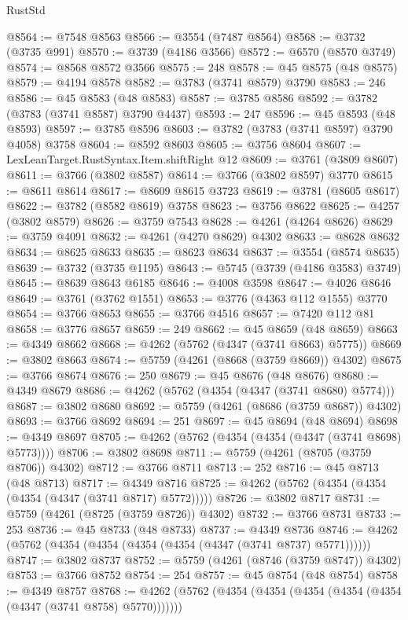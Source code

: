 \begin{lexlean}{RustStd}
\begin{coremodule}
@8564 := @7548 @8563
@8566 := @3554 (@7487 @8564)
@8568 := @3732 (@3735 @991)
@8570 := @3739 (@4186 @3566)
@8572 := @6570 (@8570 @3749)
@8574 := @8568 @8572 @3566
@8575 := 248
@8578 := @45 @8575 (@48 @8575)
@8579 := @4194 @8578
@8582 := @3783 (@3741 @8579) @3790
@8583 := 246
@8586 := @45 @8583 (@48 @8583)
@8587 := @3785 @8586
@8592 := @3782 (@3783 (@3741 @8587) @3790 @4437)
@8593 := 247
@8596 := @45 @8593 (@48 @8593)
@8597 := @3785 @8596
@8603 := @3782 (@3783 (@3741 @8597) @3790 @4058) @3758
@8604 := @8592 @8603
@8605 := @3756 @8604
@8607 := LexLeanTarget.RustSyntax.Item.shiftRight @12
@8609 := @3761 (@3809 @8607)
@8611 := @3766 (@3802 @8587)
@8614 := @3766 (@3802 @8597) @3770
@8615 := @8611 @8614
@8617 := @8609 @8615 @3723
@8619 := @3781 (@8605 @8617)
@8622 := @3782 (@8582 @8619) @3758
@8623 := @3756 @8622
@8625 := @4257 (@3802 @8579)
@8626 := @3759 @7543
@8628 := @4261 (@4264 @8626)
@8629 := @3759 @4091
@8632 := @4261 (@4270 @8629) @4302
@8633 := @8628 @8632
@8634 := @8625 @8633
@8635 := @8623 @8634
@8637 := @3554 (@8574 @8635)
@8639 := @3732 (@3735 @1195)
@8643 := @5745 (@3739 (@4186 @3583) @3749)
@8645 := @8639 @8643 @6185
@8646 := @4008 @3598
@8647 := @4026 @8646
@8649 := @3761 (@3762 @1551)
@8653 := @3776 (@4363 @112 @1555) @3770
@8654 := @3766 @8653
@8655 := @3766 @4516
@8657 := @7420 @112 @81
@8658 := @3776 @8657
@8659 := 249
@8662 := @45 @8659 (@48 @8659)
@8663 := @4349 @8662
@8668 := @4262 (@5762 (@4347 (@3741 @8663) @5775))
@8669 := @3802 @8663
@8674 := @5759 (@4261 (@8668 (@3759 @8669)) @4302)
@8675 := @3766 @8674
@8676 := 250
@8679 := @45 @8676 (@48 @8676)
@8680 := @4349 @8679
@8686 := @4262 (@5762 (@4354 (@4347 (@3741 @8680) @5774)))
@8687 := @3802 @8680
@8692 := @5759 (@4261 (@8686 (@3759 @8687)) @4302)
@8693 := @3766 @8692
@8694 := 251
@8697 := @45 @8694 (@48 @8694)
@8698 := @4349 @8697
@8705 := @4262 (@5762 (@4354 (@4354 (@4347 (@3741 @8698) @5773))))
@8706 := @3802 @8698
@8711 := @5759 (@4261 (@8705 (@3759 @8706)) @4302)
@8712 := @3766 @8711
@8713 := 252
@8716 := @45 @8713 (@48 @8713)
@8717 := @4349 @8716
@8725 := @4262 (@5762 (@4354 (@4354 (@4354 (@4347 (@3741 @8717) @5772)))))
@8726 := @3802 @8717
@8731 := @5759 (@4261 (@8725 (@3759 @8726)) @4302)
@8732 := @3766 @8731
@8733 := 253
@8736 := @45 @8733 (@48 @8733)
@8737 := @4349 @8736
@8746 := @4262 (@5762 (@4354 (@4354 (@4354 (@4354 (@4347 (@3741 @8737) @5771))))))
@8747 := @3802 @8737
@8752 := @5759 (@4261 (@8746 (@3759 @8747)) @4302)
@8753 := @3766 @8752
@8754 := 254
@8757 := @45 @8754 (@48 @8754)
@8758 := @4349 @8757
@8768 := @4262 (@5762 (@4354 (@4354 (@4354 (@4354 (@4354 (@4347 (@3741 @8758) @5770)))))))

\end{coremodule}
\end{lexlean}
